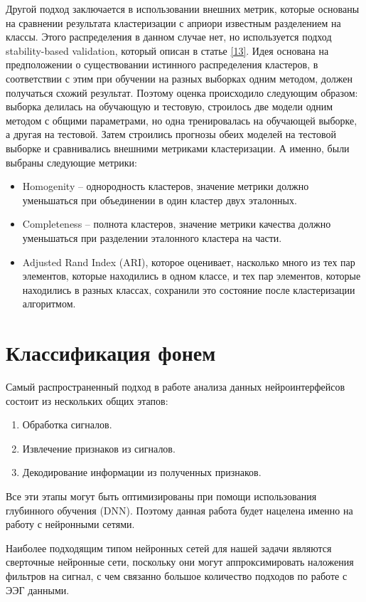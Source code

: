 \documentclass[a4paper,14pt]{extarticle}
\begin{document}
Другой подход заключается в использовании внешних метрик, которые основаны на сравнении результата кластеризации с априори известным разделением на классы. Этого распределения в данном случае нет, но используется подход stability-based validation, который описан в статье \hyperlink{b_13}{[13]}. Идея основана на предположении о существовании истинного распределения кластеров, в соответствии с этим при обучении на разных выборках одним методом, должен получаться схожий результат. Поэтому оценка происходило следующим образом: выборка делилась на обучающую и тестовую, строилось две модели одним методом с общими параметрами, но одна тренировалась на обучающей выборке, а другая на тестовой. Затем строились прогнозы обеих моделей на тестовой выборке и сравнивались внешними метриками кластеризации. А именно, были выбраны следующие метрики:
\begin{itemize}
	\item Homogenity – однородность кластеров, значение метрики должно уменьшаться при объединении в один кластер двух эталонных. 
	\item Completeness – полнота кластеров, значение метрики качества должно уменьшаться при разделении эталонного кластера на части.
	\item Adjusted Rand Index (ARI), которое оценивает, насколько много из тех пар элементов, которые находились в одном классе, и тех пар элементов, которые находились в разных классах, сохранили это состояние после кластеризации алгоритмом.
\end{itemize}

\section{Классификация фонем}
Самый распространенный подход в работе анализа данных нейроинтерфейсов состоит из нескольких общих этапов:
\begin{enumerate}
	\item Обработка сигналов.
	\item Извлечение признаков из сигналов.
	\item Декодирование информации из полученных признаков.
\end{enumerate}

Все эти этапы могут быть оптимизированы при помощи использования глубинного обучения (DNN). Поэтому данная работа будет нацелена именно на работу с нейронными сетями.

Наиболее подходящим типом нейронных сетей для нашей задачи являются сверточные нейронные сети, поскольку они могут аппроксимировать наложения фильтров на сигнал, с чем связанно большое количество подходов по работе с ЭЭГ данными.
\end{document}
